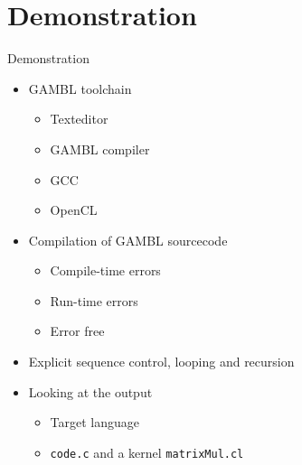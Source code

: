 \section{Demonstration} %
\label{sec:demonstration}
\begin{frame}{Demonstration}
    \begin{itemize}
        \item GAMBL toolchain
        \begin{itemize}
            \item Texteditor
            \item GAMBL compiler
            \item GCC
            \item OpenCL 
        \end{itemize}
        \item Compilation of GAMBL sourcecode
        \begin{itemize}
            \item Compile-time errors
            \item Run-time errors
            \item Error free
        \end{itemize}
        \item Explicit sequence control, looping and recursion
        \item Looking at the output
        \begin{itemize}
            \item Target language
            \item \texttt{code.c} and a kernel \texttt{matrixMul.cl}
        \end{itemize}
    \end{itemize}
\end{frame}

